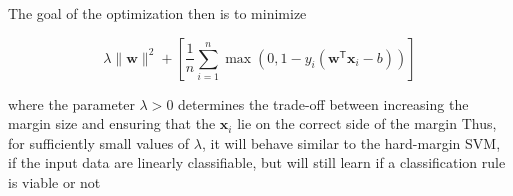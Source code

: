 \documentclass[aspectratio=169]{beamer}\usepackage[]{graphicx}\usepackage[]{xcolor}
\begin{document}
\begin{frame}
   
    The goal of the optimization then is to minimize
    
    \[ 
        \lambda \lVert \mathbf{w} \rVert^2 +\left[\frac 1 n \sum_{i=1}^n \max\left(0, 1 - y_i(\mathbf{w}^\mathsf{T} \mathbf{x}_i - b)\right) \right]
    \]
    
    where the parameter $\lambda > 0$ determines the trade-off between increasing the margin size and ensuring that the $\mathbf{x}_i$ lie on the correct side of the margin
    \vfill
    Thus, for sufficiently small values of $\lambda$, it will behave similar to the hard-margin SVM, if the input data are linearly classifiable, but will still learn if a classification rule is viable or not
\end{frame}
\end{document}
